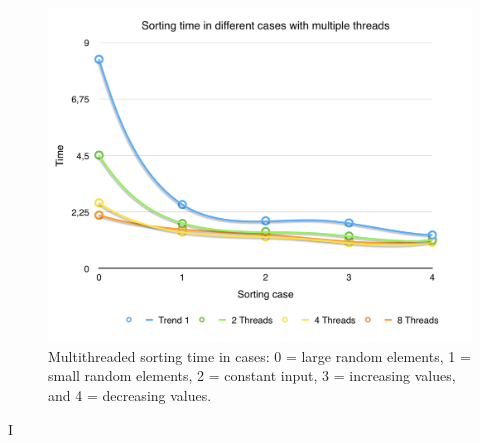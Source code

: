 \documentclass[a4paper,10pt]{article}
\begin{document}
\begin{figure}[H]
\centering
\includegraphics[width=1\textwidth]{figures/w3_SortingTime}
\caption{Multithreaded sorting time in cases:  0 = large random elements, 1 = small random elements, 2 = constant input, 3 = increasing values, and 4 = decreasing values.}
\label{fig:pca_type}
\end{figure}




I
\end{document}
